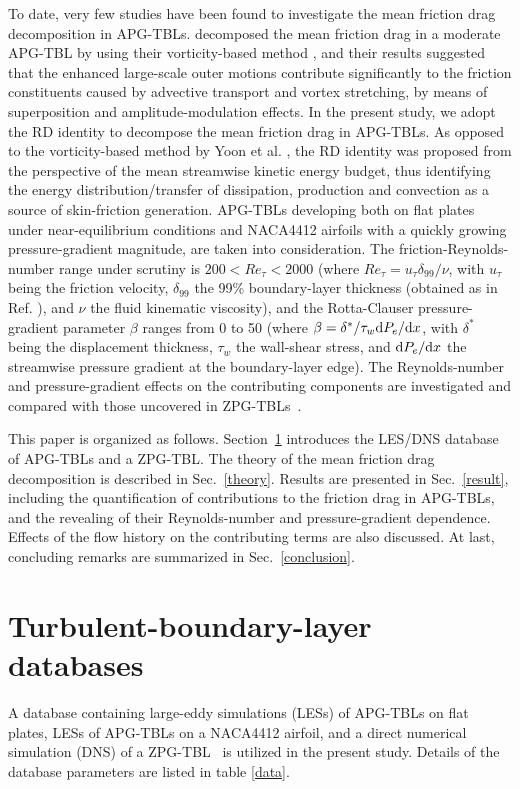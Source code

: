 To date, very few studies have been found to investigate the mean friction drag decomposition in APG-TBLs. 
\citet{Yoon2018} decomposed the mean friction drag in a moderate APG-TBL by using their vorticity-based method  \cite{Yoon2016}, and their results suggested that the enhanced large-scale outer motions contribute significantly to the friction constituents caused by advective transport and vortex stretching, by means of superposition and amplitude-modulation effects.
{\color{black}
In the present study, we adopt the RD identity to decompose the mean friction drag in APG-TBLs. As opposed to the vorticity-based method by Yoon et al. \cite{Yoon2016}, the RD identity was proposed from the perspective of the mean streamwise kinetic energy budget, thus identifying the energy distribution/transfer of dissipation, production and convection as a source of skin-friction generation.
}
APG-TBLs developing both on flat plates under near-equilibrium conditions \cite{Bobke2017,Townsend1976} and NACA4412 airfoils with a quickly growing pressure-gradient magnitude, are taken into consideration. The friction-Reynolds-number range under scrutiny is $200<Re_\tau<2000$ (where $Re_\tau=u_\tau\delta_{99}/\nu$, with $u_\tau$ being the friction velocity, $\delta_{99}$ the 99\% boundary-layer thickness (obtained as in Ref. \cite{Vinuesa2016}), and $\nu$ the fluid kinematic viscosity), and the Rotta-Clauser pressure-gradient parameter $\beta$ \cite{Rotta1950,Clauser1954,Clauser1956} ranges from 0 to 50 (where $\beta=\delta^*/\tau_w {\rm d}P_e/{\rm d}x$, with $\delta^*$ being the displacement thickness, $\tau_w$ the wall-shear stress, and ${\rm d}P_e/{\rm d}x$ the streamwise pressure gradient at the boundary-layer edge).
The Reynolds-number and pressure-gradient effects on the contributing components are investigated and compared with those uncovered in ZPG-TBLs~\cite{Fan2019}.


This paper is organized as follows. 
Section~\ref{database} introduces the LES/DNS database of APG-TBLs and a ZPG-TBL. 
The theory of the mean friction drag decomposition is described in Sec.~\ref{theory}.
Results are presented in Sec.~\ref{result}, including the quantification of contributions to the friction drag in APG-TBLs, and the revealing of their Reynolds-number and pressure-gradient dependence. Effects of the flow history on the contributing terms are also discussed.
At last, concluding remarks are summarized in Sec.~\ref{conclusion}.


\section{Turbulent-boundary-layer databases}\label{database}
A database containing large-eddy simulations (LESs) of APG-TBLs on flat plates\cite{Bobke2017,Pozuelo2020}, LESs of APG-TBLs on a NACA4412 airfoil\cite{Vinuesa2018}, and a direct numerical simulation (DNS) of a ZPG-TBL~\cite{Schlatter2010} is utilized in the present study.
Details of the database parameters are listed in table \ref{data}.  

